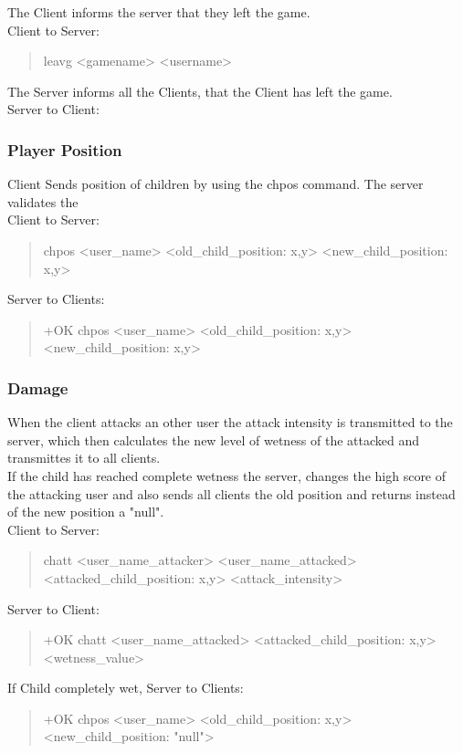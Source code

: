 \documentclass[a4paper,11pt]{article}
\begin{document}
\noindent
The Client informs the server that they left the game.\\
Client to Server:
\begin{quote}
  leavg <gamename> <username>
\end{quote}

\noindent
The Server informs all the Clients, that the Client has left the game.\\
Server to Client:


\subsubsection{Player Position}
Client Sends position of children by using the chpos command. The server validates the \\
Client to Server:
\begin{quote}
  chpos <user\_name> <old\_child\_position: x,y> <new\_child\_position: x,y>
\end{quote}
\noindent
Server to Clients:
\begin{quote}
  +OK chpos <user\_name> <old\_child\_position: x,y> <new\_child\_position: x,y>
\end{quote}
\clearpage  
\subsubsection{Damage}
When the client attacks an other user the attack intensity is transmitted to the server, which then calculates the new level of wetness of the attacked and transmittes it to all clients.\\
If the child has reached complete wetness the server, changes the high score of the attacking user and also sends all clients the old position and returns instead of the new position a "null".\\
Client to Server:
\begin{quote}
  chatt <user\_name\_attacker> <user\_name\_attacked> <attacked\_child\_position: x,y> <attack\_intensity>
\end{quote}
\noindent
Server to Client:
\begin{quote}
  +OK chatt <user\_name\_attacked> <attacked\_child\_position: x,y> <wetness\_value>
\end{quote}
\noindent
If Child  completely wet, Server to Clients:
\begin{quote}
  +OK chpos <user\_name> <old\_child\_position: x,y> <new\_child\_position: "null">
\end{quote}
\end{document}
